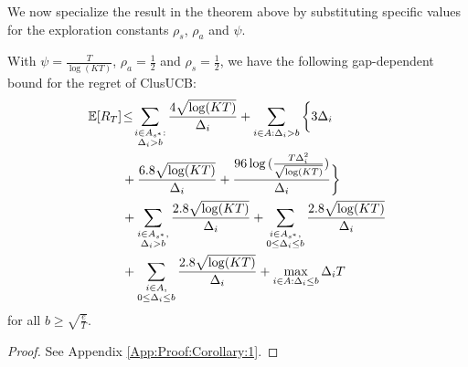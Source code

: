We now specialize the result in the theorem above by substituting specific values for the exploration constants $\rho_{s}$, $\rho_{a}$ and $\psi$. 

\begin{corollary}
\label{Result:Corollary:1}
With $\psi=\frac{T}{\log (KT)}$, $\rho_{a}=\frac{1}{2}$ and $\rho_{s}=\frac{1}{2}$,  we have the following gap-dependent bound for the regret of ClusUCB:
\begin{align*}
\mathbb{E} [R_T] &\!\le\! \sum_{\substack{i\in A_{s^{*}}: \\ \Delta_{i} > b}}\dfrac{4\sqrt{\log (KT)}}{\Delta_{i}} + \sum_{i\in A:\Delta_{i} > b}\bigg\lbrace 3\Delta_{i}\\
& + \dfrac{6.8\sqrt{\log (KT)}}{\Delta_{i}}  + \dfrac{96\log{(\frac{T\Delta_{i}^{2}}{\sqrt{\log (KT)}})}}{\Delta_{i}}\bigg\rbrace \\
&+ \sum\limits_{\substack{i\in A_{s^{*}},\\ \Delta_{i} > b}}\dfrac{2.8\sqrt{\log (KT)}}{\Delta_{i}} + \sum\limits_{\substack{i\in A_{s^{*}},\\0\leq\Delta_{i}\leq b}}\dfrac{2.8\sqrt{\log (KT)}}{\Delta_{i}} \\ 
&+ \sum\limits_{\substack{i\in A,\\0\leq\Delta_{i}\leq b}}\dfrac{2.8\sqrt{\log (KT)}}{\Delta_{i}} + \max\limits_{i\in A:\Delta_{i}\leq b}\Delta_{i}T
\end{align*} 
 for all $b\geq \sqrt{\frac{e}{T}}$.
\end{corollary}
\begin{proof}
 See Appendix \ref{App:Proof:Corollary:1}.
\end{proof}


